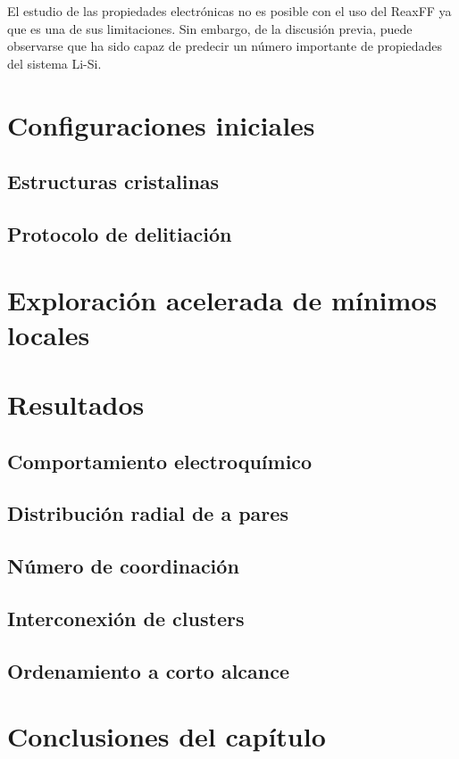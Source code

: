 El estudio de las propiedades electrónicas no es posible con el uso del ReaxFF ya
que es una de sus limitaciones. Sin embargo, de la discusión previa, puede 
observarse que ha sido capaz de predecir un número importante de propiedades del 
sistema Li-Si.

\section{Configuraciones iniciales}

\subsection{Estructuras cristalinas}
\subsection{Protocolo de delitiación}

\section{Exploración acelerada de mínimos locales}

\section{Resultados}

\subsection{Comportamiento electroquímico}
\subsection{Distribución radial de a pares}
\subsection{Número de coordinación}
\subsection{Interconexión de clusters}
\subsection{Ordenamiento a corto alcance}

\section{Conclusiones del capítulo}
